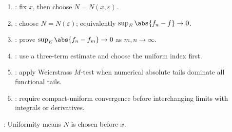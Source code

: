 \begin{method} \label{meth:uniform-convergence-proof-patterns-source-todo}\label{meth:uniform-convergence-proof-patterns} 
\begin{enumerate}[label=(\roman*)]
\setlength{\itemsep}{0pt}
\item {}: fix $x$, then choose $N=N(x,\varepsilon)$.
\item {}: choose $N=N(\varepsilon)$; equivalently $\sup_E\abs{f_n-f}\to0$.
\item {}: prove $\sup_E\abs{f_n-f_m}\to0$ as $m,n\to\infty$.
\item {}: use a three-term estimate and choose the uniform index first.
\item {}: apply Weierstrass $M$-test when numerical absolute tails dominate all functional tails.
\item {}: require compact-uniform convergence before interchanging limits with integrals or derivatives.
\end{enumerate}
: Uniformity means $N$ is chosen before $x$.
\end{method}
